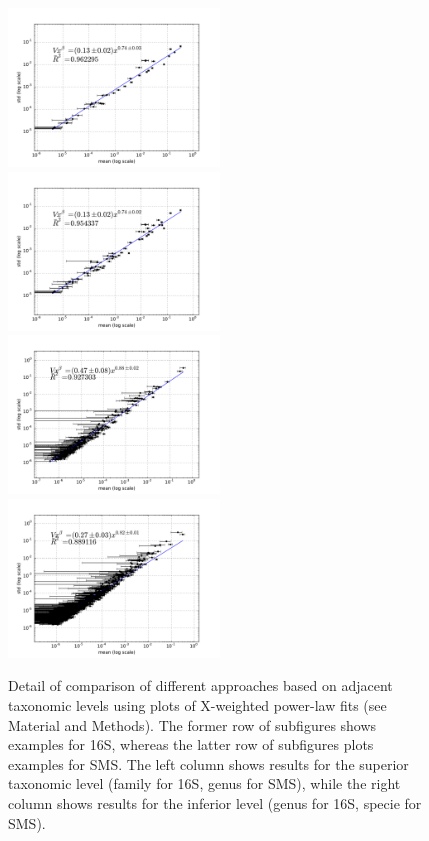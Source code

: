 \begin{figure} 
  \includegraphics[width=0.5\textwidth]{results/taxalevel/xWb_fam_16S.pdf}
  \includegraphics[width=0.5\textwidth]{results/taxalevel/xWb_gen_16S.pdf}
  \includegraphics[width=0.5\textwidth]{results/taxalevel/xWb_gen_SMS.pdf}
  \includegraphics[width=0.5\textwidth]{results/taxalevel/xWb_spc_SMS.pdf}
\caption{Detail of comparison of different approaches based on adjacent taxonomic levels using plots of X-weighted power-law fits (see Material and Methods). The former row of subfigures shows examples for 16S, whereas the latter row of subfigures plots examples for SMS. The left column shows results for the superior taxonomic level (family for 16S, genus for SMS), while the right column shows results for the inferior level (genus for 16S, specie for SMS).}
\label{fig:taxlev2}
\end{figure}

